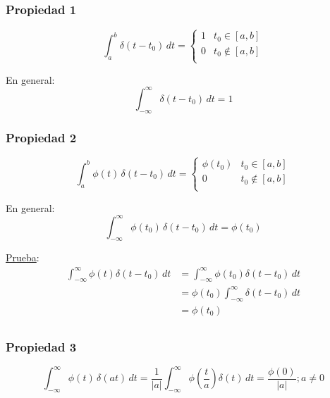 \subsubsection*{Propiedad 1}
\begin{equation*}
    \int_a^b\delta(t-t_0)\,dt=\begin{cases}
        1&t_0\in[a,b]\\
        0&t_0\notin[a,b]\\
    \end{cases}
\end{equation*}

En general:
\begin{equation}
    \int_{-\infty}^{\infty}\delta(t-t_0)\,dt=1
\end{equation}

\subsubsection*{Propiedad 2}
\begin{equation*}
    \int_a^b\phi(t)\,\delta(t-t_0)\,dt=\begin{cases}
        \phi(t_0)&t_0\in[a,b]\\
        0&t_0\notin[a,b]\\
    \end{cases}
\end{equation*}

En general:
\begin{equation}
    \int_{-\infty}^{\infty}\phi(t_0)\,\delta(t-t_0)\,dt=\phi(t_0)
\end{equation}

\underline{Prueba}:
\begin{equation*}
\begin{split}
    \int_{-\infty}^{\infty}\phi(t)\delta(t-t_0)\,dt
        &=\int_{-\infty}^{\infty}\phi(t_0)\delta(t-t_0)\,dt\\
        &=\phi(t_0)\int_{-\infty}^{\infty}\delta(t-t_0)\,dt\\
        &=\phi(t_0)\\
\end{split}
\end{equation*}

\subsubsection*{Propiedad 3}
\begin{equation}
    \int_{-\infty}^{\infty}\phi(t)\,\delta(at)\,dt
        =\frac{1}{|a|}\int_{-\infty}^{\infty}
            \phi\left(\frac{t}{a}\right)\delta(t)\,dt
        =\frac{\phi(0)}{|a|};a\neq0
\end{equation}

